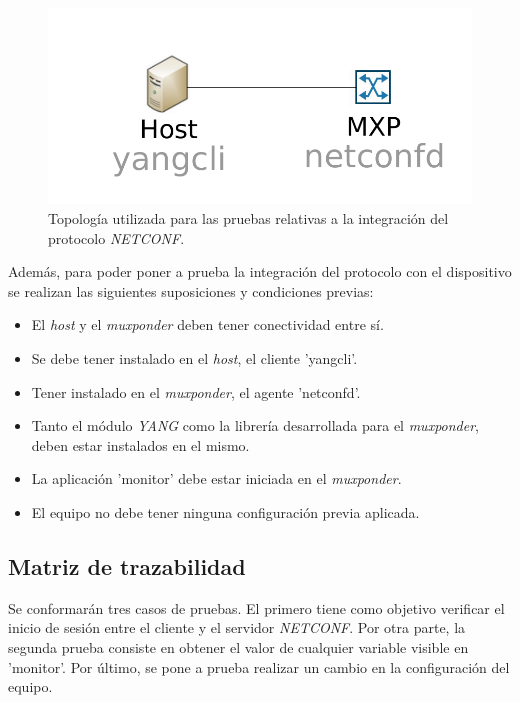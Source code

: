 \begin{figure}[!h]
	\centering
	\includegraphics[scale=0.8]{Figures/topologiatestnetconf.pdf}
	\caption{Topología utilizada para las pruebas relativas a la integración del protocolo \textit{NETCONF}.}
	\label{fig:test_topo_netconf}
  \end{figure}

  \newpage

Además, para poder poner a prueba la integración del protocolo con el dispositivo se realizan las siguientes suposiciones y condiciones previas:

\begin{itemize}
	\item El \textit{host} y el \textit{muxponder} deben tener conectividad entre sí.
    \item Se debe tener instalado en el \textit{host}, el cliente 'yangcli'.
    \item Tener instalado en el \textit{muxponder}, el agente 'netconfd'.
    \item Tanto el módulo \textit{YANG} como la librería desarrollada para el \textit{muxponder}, deben estar instalados en el mismo.
    \item La aplicación 'monitor' debe estar iniciada en el \textit{muxponder}.
    \item El equipo no debe tener ninguna configuración previa aplicada.
\end{itemize}

\subsection{Matriz de trazabilidad}

Se conformarán tres casos de pruebas. El primero tiene como objetivo verificar el inicio de sesión entre el cliente y el servidor \textit{NETCONF}. Por otra parte, la segunda prueba consiste en obtener el valor de cualquier variable visible en 'monitor'. Por último, se pone a prueba realizar un cambio en la configuración del equipo.

